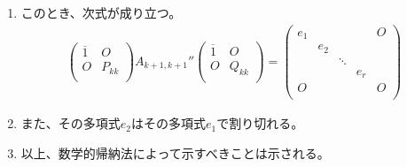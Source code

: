\documentclass[dvipdfmx]{jsarticle}
\begin{document}
\begin{enumerate}
\item
  このとき、次式が成り立つ。
\begin{align*}
\begin{pmatrix}
\overline{1} & O \\
O & P_{kk} \\
\end{pmatrix}A_{k + 1,k + 1}''\begin{pmatrix}
\overline{1} & O \\
O & Q_{kk} \\
\end{pmatrix} = \begin{pmatrix}
e_{1} & \  & \  & \  & O \\
\  & e_{2} & \  & \  & \  \\
\  & \  & \ddots & \  & \  \\
\  & \  & \  & e_{r} & \  \\
O & \  & \  & \  & O \\
\end{pmatrix}
\end{align*}
\item
  また、その多項式$e_{2}$はその多項式$e_{1}$で割り切れる。
\item
  以上、数学的帰納法によって示すべきことは示される。
\end{enumerate}
\end{document}
